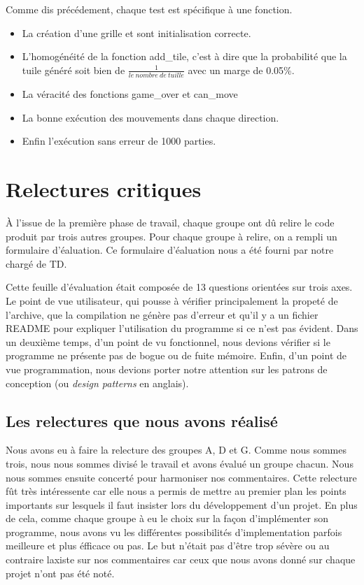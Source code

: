\documentclass[12pt]{article}
\begin{document}
\par Comme dis pr\'ec\'edement, chaque test est sp\'ecifique \`a une fonction.
\begin{itemize}
  \item La cr\'eation d'une grille et sont initialisation correcte.
  \item L'homog\'en\'eit\'e de la fonction add\_tile, c'est \`a dire que la
  probabilit\'e que la tuile g\'en\'er\'e soit bien de $
  \frac{1}{le\ nombre\ de\ tuille} $ avec un marge de 0.05\%.
  \item La v\'eracit\'e des fonctions \og game\_over \fg{} et \og can\_move
  \fg{}
  \item La bonne ex\'ecution des mouvements dans chaque direction.
  \item Enfin l'ex\'ecution sans erreur de 1000 parties.
\end{itemize}

\newpage
\section{Relectures critiques}
\`A l’issue de la premi\`ere phase de travail, chaque groupe ont d\^u relire le
code produit par trois autres groupes. Pour chaque groupe \`a relire, on a
rempli un formulaire d’\'ealuation. Ce formulaire d’\'ealuation nous a \'et\'e
fourni par notre charg\'e de TD.

\par Cette feuille d'\'evaluation \'etait compos\'ee de 13 questions orient\'ees
sur trois axes. Le point de vue utilisateur, qui pousse \`a v\'erifier
principalement la propet\'e de l'archive, que la compilation ne g\'en\`ere pas
d'erreur et qu'il y a un fichier \og README \fg{} pour expliquer l'utilisation
du programme si ce n'est pas \'evident. Dans un deuxi\`eme temps, d'un point de
vu fonctionnel, nous devions v\'erifier si le programme ne pr\'esente pas de
bogue ou de fuite m\'emoire. Enfin, d'un point de vue programmation, nous
devions porter notre attention sur les patrons de conception (ou \textit{design
patterns} en anglais).

\subsection{Les relectures que nous avons r\'ealis\'e}
Nous avons eu \`a faire la relecture des groupes A, D et G. Comme nous sommes
trois, nous nous sommes divis\'e le travail et avons \'evalu\'e un groupe
chacun. Nous nous sommes ensuite concert\'e pour harmoniser nos commentaires.
Cette relecture f\^ut tr\`es int\'eressente car elle nous a permis de mettre au
premier plan les points importants sur lesquels il faut insister lors du
d\'eveloppement d'un projet. En plus de cela, comme chaque groupe à eu le choix
sur la façon d'impl\'ementer son programme, nous avons vu les diff\'erentes
possibilit\'es d'implementation parfois meilleure et plus \'efficace ou pas. Le
but n'\'etait pas d'\^etre trop s\'ev\`ere ou au contraire laxiste sur nos
commentaires car ceux que nous avons donn\'e sur chaque projet n'ont pas \'et\'e
not\'e.
\end{document}
